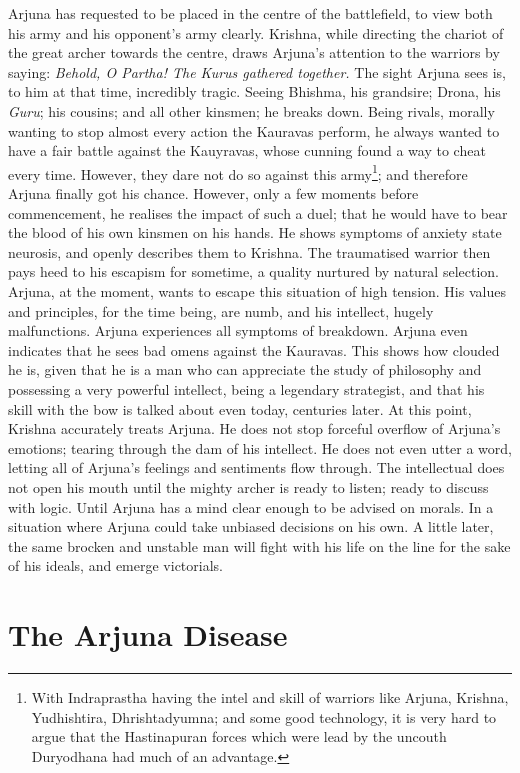 \documentclass{article}
\newcommand{\tit}[1]{\textit{#1}}
\newcommand{\guru}{\tit{Guru}}
\begin{document}
Arjuna has requested to be placed in the centre of the battlefield, to view both his army and his opponent's army clearly. Krishna, while directing the chariot of the great archer towards the centre, draws Arjuna's attention to the warriors by saying: \tit{Behold, O Partha! The Kurus gathered together.} The sight Arjuna sees is, to him at that time, incredibly tragic. Seeing Bhishma, his grandsire; Drona, his \guru; his cousins; and all other kinsmen; he breaks down. Being rivals, morally wanting to stop almost every action the Kauravas perform, he always wanted to have a fair battle against the Kauyravas, whose cunning found a way to cheat every time. However, they dare not do so against this army\footnote[1]{With Indraprastha having the intel and skill of warriors like Arjuna, Krishna, Yudhishtira, Dhrishtadyumna; and some good technology, it is very hard to argue that the Hastinapuran forces which were lead by the uncouth Duryodhana had much of an advantage.}; and therefore Arjuna finally got his chance. However, only a few moments before commencement, he realises the impact of such a duel; that he would have to bear the blood of his own kinsmen on his hands. He shows symptoms of anxiety state neurosis, and openly describes them to Krishna. The traumatised warrior then pays heed to his escapism for sometime, a quality nurtured by natural selection. Arjuna, at the moment, wants to escape this situation of high tension. His values and principles, for the time being, are numb, and his intellect, hugely malfunctions. Arjuna experiences all symptoms of breakdown. Arjuna even indicates that he sees bad omens against the Kauravas. This shows how clouded he is, given that he is a man who can appreciate the study of philosophy and possessing a very powerful intellect, being a legendary strategist, and that his skill with the bow is talked about even today, centuries later. At this point, Krishna accurately treats Arjuna. He does not stop forceful overflow of Arjuna's emotions; tearing through the dam of his intellect. He does not even utter a word, letting all of Arjuna's feelings and sentiments flow through. The intellectual does not open his mouth until the mighty archer is ready to listen; ready to discuss with logic. Until Arjuna has a mind clear enough to be advised on morals. In a situation where Arjuna could take unbiased decisions on his own. A little later, the same brocken and unstable man will fight with his life on the line for the sake of his ideals, and emerge victorials.
\newpage \section{The Arjuna Disease}
\end{document}
